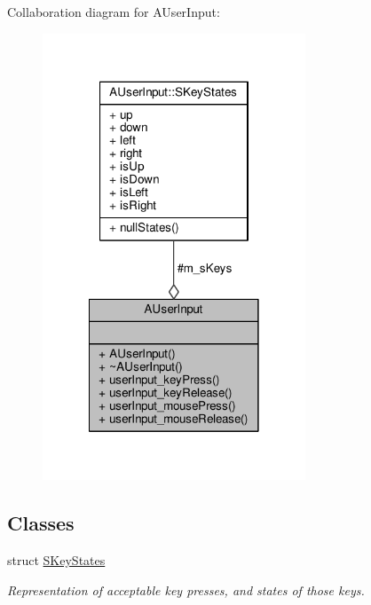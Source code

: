 Collaboration diagram for A\-User\-Input\-:\nopagebreak
\begin{figure}[H]
\begin{center}
\leavevmode
\includegraphics[width=222pt]{classAUserInput__coll__graph}
\end{center}
\end{figure}
\subsection*{Classes}
\begin{DoxyCompactItemize}
\item 
struct \hyperlink{structAUserInput_1_1SKeyStates}{S\-Key\-States}
\begin{DoxyCompactList}\small\item\em Representation of acceptable key presses, and states of those keys. \end{DoxyCompactList}\end{DoxyCompactItemize}
